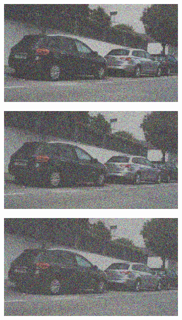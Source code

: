 \documentclass[a4paper]{ctexart}
\begin{document}
\begin{figure}[htbp]
\begin{subfigure}{0.08\textwidth}
				\label{fig：Gamma=0.4, Gauss Noise = 0.7}
			\end{subfigure}
			\begin{subfigure}{0.08\textwidth}
				\captionsetup{font=scriptsize}
				\includegraphics[width=\linewidth]{picture/Edge Detection/degrade/RGB_001 Gamma=0.4, Gauss Noise=0.8}
				\label{fig：Gamma=0.4, Gauss Noise = 0.8}
			\end{subfigure}
			\begin{subfigure}{0.08\textwidth}
				\captionsetup{font=scriptsize}
				\includegraphics[width=\linewidth]{picture/Edge Detection/degrade/RGB_001 Gamma=0.4, Gauss Noise=0.9}
				\label{fig：Gamma=0.4, Gauss Noise = 0.9}
			\end{subfigure}
			\begin{subfigure}{0.08\textwidth}
				\captionsetup{font=scriptsize}
				\includegraphics[width=\linewidth]{picture/Edge Detection/degrade/RGB_001 Gamma=0.4, Gauss Noise=1.0}

\end{subfigure}
\end{figure}
\end{document}
